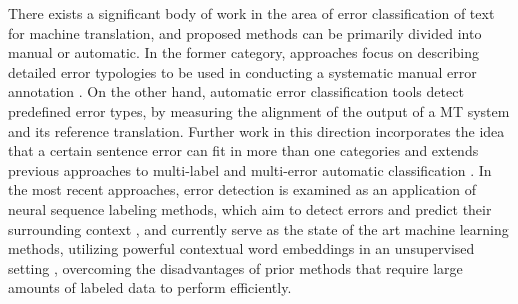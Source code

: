 
There exists a significant body of work in the area of error classification of text for machine translation, 
and proposed methods can be primarily divided into manual or automatic. In the former category, approaches focus 
on describing detailed error typologies to be used in conducting a systematic manual error annotation 
\cite{fishel2011automatic,vilar2006error, lommel2014multidimensional, farrus2010linguistic, costa2015linguistically}. 
On the other hand,  automatic error classification tools \cite{zeman2011addicter, popovic2011hjerson,popovic2015poor} 
detect predefined error types, by measuring the alignment of the output of a MT system and its reference translation. 
Further work in this direction incorporates the idea that a certain sentence error can fit in more than one categories
 \cite{klubivcka2018quantitative, lommel2014assessing} and extends previous approaches to multi-label and multi-error 
 automatic classification \cite{popovic2019automatic}. In the most recent approaches, error detection is examined as 
 an application of neural sequence labeling methods, which aim to detect errors and predict their surrounding context 
 \cite{rei2017semi}, and currently serve as the state of the art machine learning methods, utilizing powerful contextual 
 word embeddings in an unsupervised setting \cite{bell2019context}, overcoming the disadvantages of prior methods that 
 require large amounts of labeled data to perform efficiently.